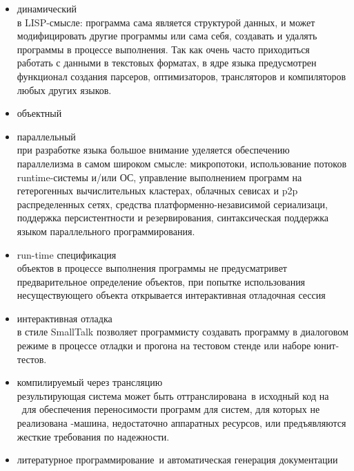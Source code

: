 \secdown

\begin{itemize}

\item динамический
\\ в LISP-смысле: программа сама является структурой данных, и может
модифицировать другие программы или сама себя, создавать и удалять программы в
процессе выполнения. Так как очень часто приходиться работать с данными в
текстовых форматах, в ядре языка предусмотрен функционал создания парсеров, 
оптимизаторов, трансляторов и компиляторов любых других языков.

\item объектный

\item параллельный
\\ при разработке языка большое внимание уделяется обеспечению параллелизма в 
самом широком смысле: микропотоки, использование потоков runtime-системы и/или
ОС, управление выполнением программ на гетерогенных вычислительных кластерах, 
облачных севисах и p2p распределенных сетях, средства платформенно-независимой
сериализаци, поддержка персистентности и резервирования, синтаксическая 
поддержка языком параллельного программирования. 

\item run-time спецификация
\\ объектов в процессе выполнения программы не предусматривет предварительное
определение объектов, при попытке использования несуществующего объекта
открывается интерактивная отладочная сессия

\item интерактивная отладка
\\ в стиле SmallTalk позволяет программисту создавать программу в диалоговом
режиме в процессе отладки и прогона на тестовом стенде или наборе юнит-тестов.

\item компилируемый через трансляцию
\\ результирующая система может быть оттранслирована\ в 
исходный код на \cpp\ для обеспечения переносимости программ для систем, для
которых не реализована \bi-машина, недостаточно аппаратных 
ресурсов, или
предъявляются жесткие требования по надежности\note{$\uparrow$}.

\item литературное программирование\ и 
автоматическая генерация документации  

\end{itemize}

